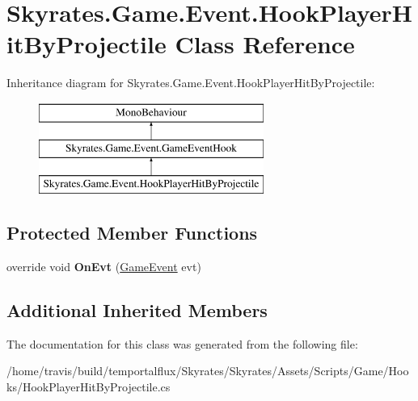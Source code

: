 \hypertarget{class_skyrates_1_1_game_1_1_event_1_1_hook_player_hit_by_projectile}{\section{Skyrates.\-Game.\-Event.\-Hook\-Player\-Hit\-By\-Projectile Class Reference}
\label{class_skyrates_1_1_game_1_1_event_1_1_hook_player_hit_by_projectile}
}
Inheritance diagram for Skyrates.\-Game.\-Event.\-Hook\-Player\-Hit\-By\-Projectile\-:\begin{figure}[H]
\begin{center}
\leavevmode
\includegraphics[height=3.000000cm]{class_skyrates_1_1_game_1_1_event_1_1_hook_player_hit_by_projectile}
\end{center}
\end{figure}
\subsection*{Protected Member Functions}
\begin{DoxyCompactItemize}
\item 
\hypertarget{class_skyrates_1_1_game_1_1_event_1_1_hook_player_hit_by_projectile_a25eba6b9888ebc95ec4f4c17f479fa36}{override void {\bfseries On\-Evt} (\hyperlink{class_skyrates_1_1_game_1_1_event_1_1_game_event}{Game\-Event} evt)}\label{class_skyrates_1_1_game_1_1_event_1_1_hook_player_hit_by_projectile_a25eba6b9888ebc95ec4f4c17f479fa36}

\end{DoxyCompactItemize}
\subsection*{Additional Inherited Members}


The documentation for this class was generated from the following file\-:\begin{DoxyCompactItemize}
\item 
/home/travis/build/temportalflux/\-Skyrates/\-Skyrates/\-Assets/\-Scripts/\-Game/\-Hooks/Hook\-Player\-Hit\-By\-Projectile.\-cs\end{DoxyCompactItemize}
